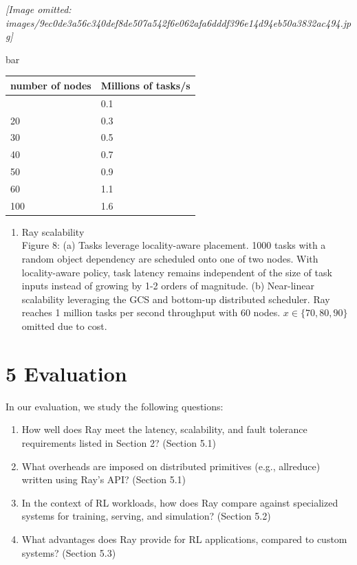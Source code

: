 \documentclass[
]{article}
\newcounter{none} %
\providecommand{\tightlist}{%
  \setlength{\itemsep}{0pt}\setlength{\parskip}{0pt}}
\begin{document}
\textit{[Image omitted: images/9ec0de3a56c340def8de507a542f6e062afa6dddf396e14d94eb50a3832ac494.jpg]}

bar

{\def\LTcaptype{none} %
\begin{longtable}[]{@{}ll@{}}
\toprule\noalign{}
number of nodes & Millions of tasks/s \\
\midrule\noalign{}
\endhead
\bottomrule\noalign{}
\endlastfoot
10 & 0.1 \\
20 & 0.3 \\
30 & 0.5 \\
40 & 0.7 \\
50 & 0.9 \\
60 & 1.1 \\
100 & 1.6 \\
\end{longtable}
}

\begin{enumerate}
\def\labelenumi{(\alph{enumi})}
\setcounter{enumi}{1}
\tightlist
\item
  Ray scalability\\
  Figure 8: (a) Tasks leverage locality-aware placement. 1000 tasks with
  a random object dependency are scheduled onto one of two nodes. With
  locality-aware policy, task latency remains independent of the size of
  task inputs instead of growing by 1-2 orders of magnitude. (b)
  Near-linear scalability leveraging the GCS and bottom-up distributed
  scheduler. Ray reaches 1 million tasks per second throughput with 60
  nodes. \(x \in \{70, 80, 90\}\) omitted due to cost.
\end{enumerate}

\section{5 Evaluation}\label{evaluation}

In our evaluation, we study the following questions:

\begin{enumerate}
\def\labelenumi{\arabic{enumi}.}
\tightlist
\item
  How well does Ray meet the latency, scalability, and fault tolerance
  requirements listed in Section 2? (Section 5.1)\\
\item
  What overheads are imposed on distributed primitives (e.g., allreduce)
  written using Ray's API? (Section 5.1)\\
\item
  In the context of RL workloads, how does Ray compare against
  specialized systems for training, serving, and simulation? (Section
  5.2)\\
\item
  What advantages does Ray provide for RL applications, compared to
  custom systems? (Section 5.3)
\end{enumerate}
\end{document}
